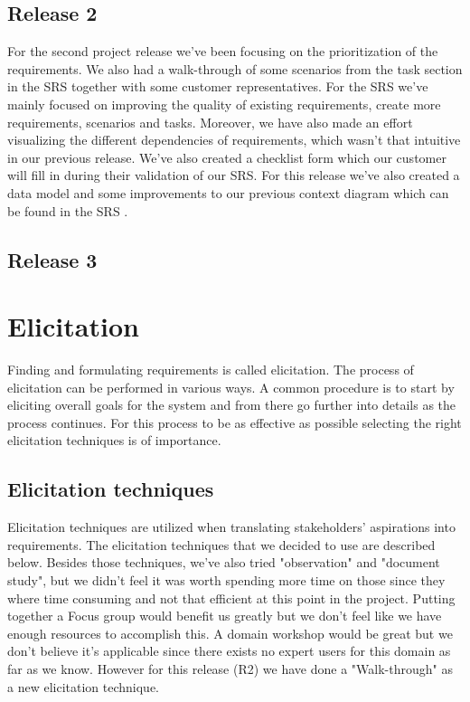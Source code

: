 \documentclass[10pt]{article}
\begin{document}
\subsection{Release 2}
For the second project release we've been focusing on the prioritization of the requirements. We also had a walk-through of some scenarios from the task section in the SRS together with some customer representatives. For the SRS we've mainly focused on improving the quality of existing requirements, create more requirements, scenarios and tasks. Moreover, we have also made an effort visualizing the different dependencies of requirements, which wasn't that intuitive in our previous release. We've also created a checklist form which our customer will fill in during their validation of our SRS.
For this release we've also created a data model and some improvements to our previous context diagram which can be found in the SRS \cite{srs}.

\subsection{Release 3}

\section{Elicitation}
\sloppy
\noindent Finding and formulating requirements is called elicitation. The process of elicitation can be performed in various ways. A common procedure is to start by eliciting overall goals for the system and from there go further into details as the process continues. For this process to be as effective as possible selecting the right elicitation techniques is of importance.

\subsection{Elicitation techniques}
Elicitation techniques are utilized when translating stakeholders' aspirations into requirements.
The elicitation techniques that we decided to use are described below.
Besides those techniques, we've also tried "observation" and "document study", but we didn't feel it was worth spending more time on those since they where time consuming and not that efficient at this point in the project.
Putting together a Focus group would benefit us greatly but we don’t feel like we have enough resources to accomplish this.
A domain workshop would be great but we don't believe it's applicable since there exists no expert users for this domain as far as we know.
However for this release (R2) we have done a "Walk-through" as a new elicitation technique.
\end{document}
